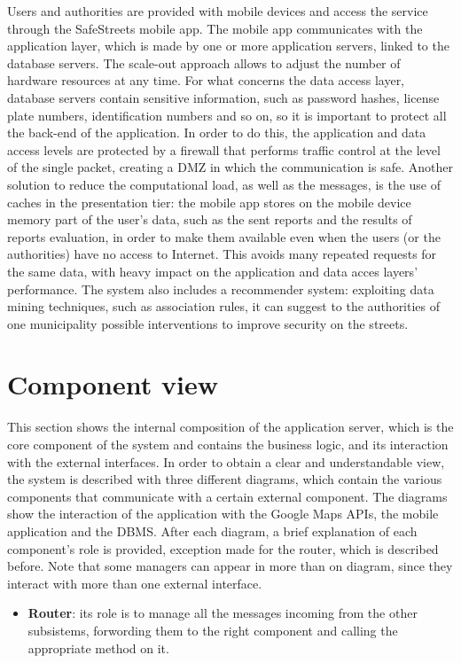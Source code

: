 \documentclass[12pt,a4paper]{report}
\begin{document}
	Users and authorities are provided with mobile devices and access the service through
	the SafeStreets mobile app. The mobile app communicates with the application layer, which
	is made by one or more application servers, linked to the database servers. The scale-out approach allows to adjust the number of hardware resources at any time. For what concerns the data access layer, database servers contain sensitive information, such as password hashes, license plate numbers, identification numbers and so on, so it is important to protect all the back-end of the application. In order to do this, the application and data access levels are protected by a firewall that performs traffic control at the level of the single packet, creating a DMZ in which the communication is safe. Another solution to reduce the computational load, as well as the messages, is the use of caches in the presentation tier: the mobile app stores on the mobile device memory part of the user's data, such as the sent reports and the results of reports evaluation, in order to make them available even when the users (or the authorities) have no access to Internet. This avoids many repeated requests for the same data, with heavy impact on the application and data acces layers' performance.
The system also includes a recommender system: exploiting data mining techniques, such as association rules, it can suggest to the authorities of one municipality possible interventions to improve security on the streets.

		\section{Component view}
		This section shows the internal composition of the application server, which is the core component of the system and contains the business logic,
		and its interaction with the external interfaces. In order to obtain a clear and understandable view, the system is described with three different diagrams,
		which contain the various components that communicate with a certain external component. The diagrams show the interaction of the application with the
		Google Maps APIs, the mobile application and the DBMS. After each diagram, a brief explanation of each component's role is provided, exception made for the 
		router, which is described before. Note that some managers can appear in more than on diagram, since they interact with more than one external
		interface.	
		
		\begin{itemize}
			\item\textbf{Router}: its role is to manage all the messages incoming from the other subsistems, forwording them to the right component and calling
			the appropriate method on it.
		\end{itemize}
\end{document}
